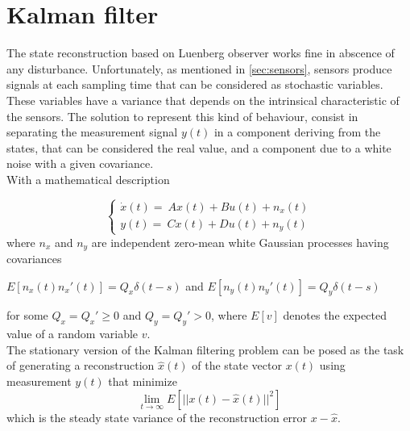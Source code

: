 \section{Kalman filter}

The state reconstruction based on Luenberg observer works fine in abscence of any disturbance. Unfortunately, as mentioned in \cref{sec:sensors}, sensors produce signals at each sampling time that can be considered as stochastic variables. These variables have a variance that depends on the intrinsical characteristic of the sensors. The solution to represent this kind of behaviour, consist in separating the measurement signal $y(t)$ in a component deriving from the states, that can be considered the real value, and a component due to a white noise with a given covariance.  \\

With a mathematical description 

\begin{equation}
	\begin{cases}
		\dot x(t) =\ A x(t) + B u(t) +n_x(t) \\
		y(t) =\ C x(t) + D u(t) + n_y(t)
	\end{cases}
\end{equation}
where $n_x$ and $n_y$ are independent zero-mean white Gaussian processes having covariances
\begin{center}
	$E[n_x(t)n_x'(t)]=Q_x \delta(t-s)$  and $E[n_y(t)n_y'(t)]=Q_y \delta(t-s) $
\end{center}
for some $Q_x = Q_x' \geq 0$ and $Q_y = Q_y' > 0$, where $E[v]$ denotes the expected value of a random variable $v$.\\

The stationary version of the Kalman filtering problem can be posed as the task of generating a reconstruction $\hat x (t)$ of the state vector $x(t)$ using measurement $y(t)$ that minimize 
\begin{equation}
	\lim_{t \to \infty }E[ ||x(t) - \hat x(t) ||^2 ]
\end{equation}
which is the steady state variance of the reconstruction error $ x-\hat x$.\\

